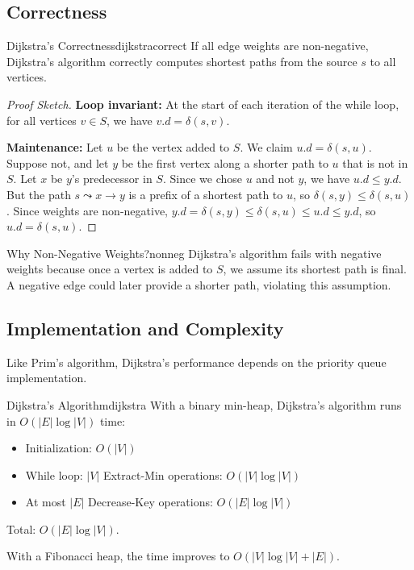 \subsection{Correctness}

\begin{theorem}{Dijkstra's Correctness}{dijkstracorrect}
If all edge weights are non-negative, Dijkstra's algorithm correctly computes shortest paths 
from the source $s$ to all vertices.
\end{theorem}

\begin{proof}[Proof Sketch]
\textbf{Loop invariant:} At the start of each iteration of the while loop, for all vertices 
$v \in S$, we have $v.d = \delta(s,v)$.

\textbf{Maintenance:} Let $u$ be the vertex added to $S$. We claim $u.d = \delta(s,u)$. 
Suppose not, and let $y$ be the first vertex along a shorter path to $u$ that is not in $S$. 
Let $x$ be $y$'s predecessor in $S$. Since we chose $u$ and not $y$, we have $u.d \le y.d$. 
But the path $s \leadsto x \to y$ is a prefix of a shortest path to $u$, so 
$\delta(s,y) \le \delta(s,u)$. Since weights are non-negative, 
$y.d = \delta(s,y) \le \delta(s,u) \le u.d \le y.d$, so $u.d = \delta(s,u)$.
\end{proof}

\begin{remark}{Why Non-Negative Weights?}{nonneg}
Dijkstra's algorithm fails with negative weights because once a vertex is added to $S$, we 
assume its shortest path is final. A negative edge could later provide a shorter path, 
violating this assumption.
\end{remark}

\subsection{Implementation and Complexity}

Like Prim's algorithm, Dijkstra's performance depends on the priority queue implementation.

\begin{complexity}{Dijkstra's Algorithm}{dijkstra}
With a binary min-heap, Dijkstra's algorithm runs in $O(|E| \log |V|)$ time:
\begin{itemize}[noitemsep]
  \item Initialization: $O(|V|)$
  \item While loop: $|V|$ Extract-Min operations: $O(|V| \log |V|)$
  \item At most $|E|$ Decrease-Key operations: $O(|E| \log |V|)$
\end{itemize}
Total: $O(|E| \log |V|)$.

With a Fibonacci heap, the time improves to $O(|V| \log |V| + |E|)$.
\end{complexity}

